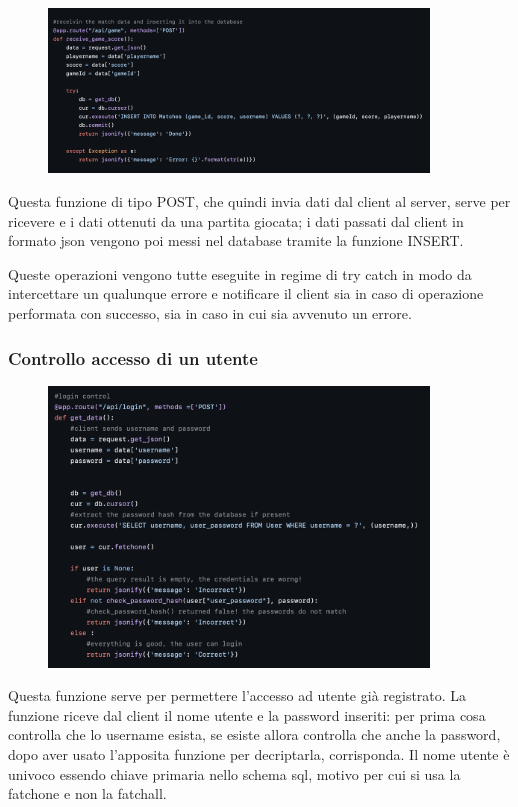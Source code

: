 \documentclass{article}
\begin{document}
\begin{figure}[H]
    \centering
    \includegraphics[width=0.9\textwidth]{images/salvare_punteggio_partite.png}
\end{figure}
Questa funzione di tipo POST, che quindi invia dati dal client al server, serve per ricevere e i dati ottenuti da una partita giocata; i dati passati dal client in formato json vengono poi messi nel database tramite la funzione INSERT. 

Queste operazioni vengono tutte eseguite in regime di try catch in modo da intercettare un qualunque errore e notificare il client sia in caso di operazione performata con successo, sia in caso in cui sia avvenuto un errore.

\subsubsection{Controllo accesso di un utente}
\begin{figure}[H]
    \centering
    \includegraphics[width=0.9\textwidth]{images/controllo_login.png}
\end{figure}

Questa funzione serve per permettere l’accesso ad utente già registrato.
La funzione riceve dal client il nome utente e la password inseriti: per prima cosa controlla che lo username esista, se esiste allora controlla che anche la password, dopo aver usato l’apposita funzione per decriptarla, corrisponda.
Il nome utente è univoco essendo chiave primaria nello schema sql, motivo per cui si usa la fatchone e non la fatchall.
\end{document}
